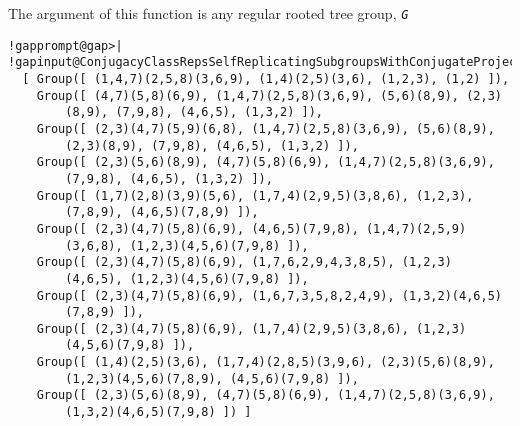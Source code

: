 \documentclass[a4paper,11pt]{report}
\begin{document}
{{{ The argument of this function is any regular rooted tree group, \mbox{\texttt{\mdseries\slshape G}} 

 }

 

 
\begin{Verbatim}[commandchars=!@|,fontsize=\small,frame=single,label=Example]
  !gapprompt@gap>| !gapinput@ConjugacyClassRepsSelfReplicatingSubgroupsWithConjugateProjection(AutT(3,1));|
  [ Group([ (1,4,7)(2,5,8)(3,6,9), (1,4)(2,5)(3,6), (1,2,3), (1,2) ]),
    Group([ (4,7)(5,8)(6,9), (1,4,7)(2,5,8)(3,6,9), (5,6)(8,9), (2,3)
        (8,9), (7,9,8), (4,6,5), (1,3,2) ]),
    Group([ (2,3)(4,7)(5,9)(6,8), (1,4,7)(2,5,8)(3,6,9), (5,6)(8,9),
        (2,3)(8,9), (7,9,8), (4,6,5), (1,3,2) ]),
    Group([ (2,3)(5,6)(8,9), (4,7)(5,8)(6,9), (1,4,7)(2,5,8)(3,6,9),
        (7,9,8), (4,6,5), (1,3,2) ]),
    Group([ (1,7)(2,8)(3,9)(5,6), (1,7,4)(2,9,5)(3,8,6), (1,2,3),
        (7,8,9), (4,6,5)(7,8,9) ]),
    Group([ (2,3)(4,7)(5,8)(6,9), (4,6,5)(7,9,8), (1,4,7)(2,5,9)
        (3,6,8), (1,2,3)(4,5,6)(7,9,8) ]),
    Group([ (2,3)(4,7)(5,8)(6,9), (1,7,6,2,9,4,3,8,5), (1,2,3)
        (4,6,5), (1,2,3)(4,5,6)(7,9,8) ]),
    Group([ (2,3)(4,7)(5,8)(6,9), (1,6,7,3,5,8,2,4,9), (1,3,2)(4,6,5)
        (7,8,9) ]),
    Group([ (2,3)(4,7)(5,8)(6,9), (1,7,4)(2,9,5)(3,8,6), (1,2,3)
        (4,5,6)(7,9,8) ]),
    Group([ (1,4)(2,5)(3,6), (1,7,4)(2,8,5)(3,9,6), (2,3)(5,6)(8,9),
        (1,2,3)(4,5,6)(7,8,9), (4,5,6)(7,9,8) ]),
    Group([ (2,3)(5,6)(8,9), (4,7)(5,8)(6,9), (1,4,7)(2,5,8)(3,6,9),
        (1,3,2)(4,6,5)(7,9,8) ]) ]
\end{Verbatim}
 }

 }

   
\end{document}
